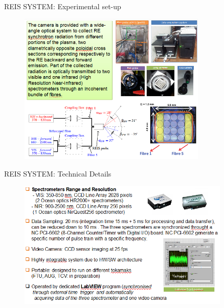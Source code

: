 \documentclass{beamer}
\begin{document}
\begin{frame}{REIS SYSTEM: Experimental set-up}
\scriptsize
\small
\begin{figure}
	\centering
    \vspace*{-0.5cm}
	\includegraphics[width=0.8\textwidth]{drive/setup.png}
\end{figure}
\end{frame}

\begin{frame}{REIS SYSTEM: Technical Details}
\scriptsize
\begin{figure}
	\centering
	\includegraphics[width=0.9\textwidth]{drive/tecnicalreis.png}
\end{figure}
\end{frame}
\end{document}
